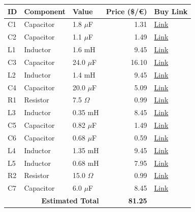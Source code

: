 \begin{table}[H]
    \centering
    \renewcommand{\arraystretch}{1.5}
    \begin{tabular}{@{}lllrl@{}}
        \toprule
        \textbf{ID} & \textbf{Component} & \textbf{Value} & \textbf{Price (\$/€)} & \textbf{Buy Link} \\
        \midrule
        C1 & Capacitor & 1.8 $\mu$F & 1.31 & \href{https://www.parts-express.com/Jantzen-0237-1.8uF-400V-Crosscap-Capacitor-027-914}{Link} \\
        C2 & Capacitor & 1.1 $\mu$F & 1.49 & \href{https://www.soundimports.eu/en/jantzen-audio-001-0232.html}{Link} \\
        L1 & Inductor & 1.6 mH & 9.45 & \href{https://www.soundimports.eu/en/jantzen-audio-000-2389.html}{Link} \\
        C3 & Capacitor & 24.0 $\mu$F & 16.10 & \href{https://www.parts-express.com/Solen-24uF-400V-Polypropylene-Capacitor-027-586}{Link} \\
        L2 & Inductor & 1.4 mH & 9.45 & \href{https://www.soundimports.eu/en/jantzen-audio-000-2388.html}{Link} \\
        C4 & Capacitor & 20.0 $\mu$F & 5.09 & \href{https://www.parts-express.com/Solen-20uF-400V-Polypropylene-Capacitor-027-582}{Link} \\
        R1 & Resistor & 7.5 $\Omega$ & 0.99 & \href{https://www.soundimports.eu/en/jantzen-audio-002-0793.html}{Link} \\
        L3 & Inductor & 0.35 mH & 8.45 & \href{https://www.soundimports.eu/en/jantzen-audio-000-1009.html}{Link} \\
        C5 & Capacitor & 0.82 $\mu$F & 1.49 & \href{https://www.soundimports.eu/en/jantzen-audio-001-0228.html}{Link} \\
        C6 & Capacitor & 0.68 $\mu$F & 0.59 & \href{https://www.parts-express.com/Dayton-Audio-DMPC-0.68-0.68uF-250V-Polypropylene-Capacitor-027-408}{Link} \\
        L4 & Inductor & 1.35 mH & 9.45 & \href{https://www.soundimports.eu/en/jantzen-audio-000-5420.html}{Link} \\
        L5 & Inductor & 0.68 mH & 7.95 & \href{https://www.soundimports.eu/en/jantzen-audio-000-2368.html}{Link} \\
        R2 & Resistor & 15.0 $\Omega$ & 0.99 & \href{https://www.soundimports.eu/en/jantzen-audio-002-0637.html}{Link} \\
        C7 & Capacitor & 6.0 $\mu$F & 8.45 & \href{https://www.soundimports.eu/en/claritycap-px6u0j250vdc.html}{Link} \\
        \midrule
        \multicolumn{3}{r}{\textbf{Estimated Total}} & \textbf{81.25} & \\
        \bottomrule
    \end{tabular}
\end{table}
